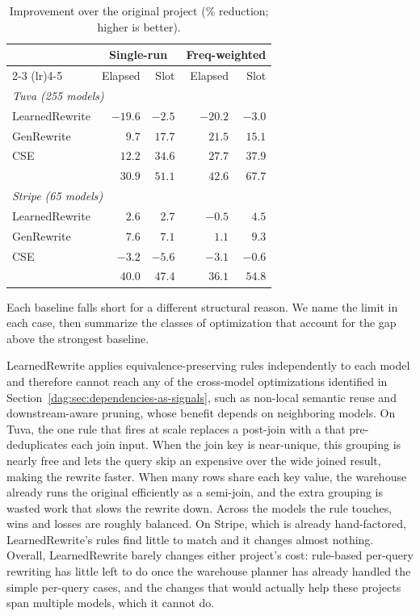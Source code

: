 \begin{table}[tb]
\centering
\caption{Improvement over the original project (\% reduction; higher is better). }
\inv
\label{dag:tab:overall}
\small
\begin{tabular}{lrrrr}
\toprule
& \multicolumn{2}{c}{Single-run} & \multicolumn{2}{c}{Freq-weighted} \\
\cmidrule(lr){2-3} \cmidrule(lr){4-5}
& Elapsed & Slot & Elapsed & Slot \\
\midrule
\multicolumn{5}{l}{\emph{Tuva (255 models)}} \\
LearnedRewrite & $-19.6$ & $-2.5$ & $-20.2$ & $-3.0$ \\
GenRewrite     & $9.7$   & $17.7$ & $21.5$  & $15.1$ \\
CSE            & $12.2$  & $34.6$ & $27.7$  & $37.9$ \\
\dagsmith{}        & $\mathbf{30.9}$ & $\mathbf{51.1}$ & $\mathbf{42.6}$ & $\mathbf{67.7}$ \\
\midrule
\multicolumn{5}{l}{\emph{Stripe (65 models)}} \\
LearnedRewrite & $2.6$   & $2.7$   & $-0.5$  & $4.5$  \\
GenRewrite     & $7.6$   & $7.1$   & $1.1$   & $9.3$  \\
CSE            & $-3.2$  & $-5.6$  & $-3.1$  & $-0.6$ \\
\dagsmith{}        & $\mathbf{40.0}$ & $\mathbf{47.4}$ & $\mathbf{36.1}$ & $\mathbf{54.8}$ \\
\bottomrule
\end{tabular}
\inv
\end{table}


Each baseline falls short for a different structural reason. We name the limit in each case, then summarize the classes of optimization that account for the gap above the strongest baseline.

 LearnedRewrite applies equivalence-preserving rules independently to each model and therefore cannot reach any of the cross-model optimizations identified in Section~\ref{dag:sec:dependencies-as-signals}, such as non-local semantic reuse and downstream-aware pruning, whose benefit depends on neighboring models. On Tuva, the one rule that fires at scale replaces a post-join  with a  that pre-deduplicates each join input. When the join key is near-unique, this grouping is nearly free and lets the query skip an expensive  over the wide joined result, making the rewrite faster. When many rows share each key value, the warehouse already runs the original efficiently as a semi-join, and the extra grouping is wasted work that slows the rewrite down. Across the models the rule touches, wins and losses are roughly balanced. On Stripe, which is already hand-factored, LearnedRewrite's rules find little to match and it changes almost nothing. Overall, LearnedRewrite barely changes either project's cost: rule-based per-query rewriting has little left to do once the warehouse planner has already handled the simple per-query cases, and the changes that would actually help these projects span multiple models, which it cannot do.


